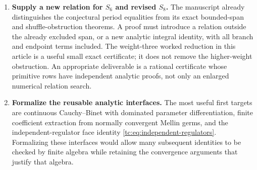 \begin{enumerate}[label=\textbf{Q\arabic*.},leftmargin=*]
\item \textbf{Supply a new relation for $S_6$ and revised $S_8$.}
The manuscript already distinguishes the conjectural period
equalities from its exact bounded-span and shuffle-obstruction
theorems. A proof must introduce a relation outside the
already excluded span, or a new analytic integral identity,
with all branch and endpoint terms included. The weight-three
worked reduction in this article is a useful small exact
certificate; it does not remove the higher-weight obstruction.
An appropriate deliverable is a rational certificate whose
primitive rows have independent analytic proofs, not only an
enlarged numerical relation search.

\item \textbf{Formalize the reusable analytic interfaces.}
The most useful first targets are continuous Cauchy--Binet with
dominated parameter differentiation, finite coefficient
extraction from normally convergent Mellin germs, and the
independent-regulator face identity
\eqref{tc:eq:independent-regulators}. Formalizing these
interfaces would allow many subsequent identities to be
checked by finite algebra while retaining the convergence
arguments that justify that algebra.

\end{enumerate}

